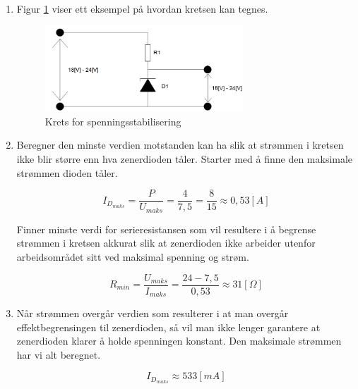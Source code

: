 \begin{solution}[name=Løsningsforslag oppgave]
\begin{enumerate}[label=\roman*)]
	\item Figur \ref{fig:zenKrets1} viser ett eksempel på hvordan kretsen kan tegnes.
		\begin{figure}[H]
			\centering
			\includegraphics[width=0.7\textwidth]{diode/figurer/zenKrets1.png}
			\caption{Krets for spenningsstabilisering}
			\label{fig:zenKrets1}
		\end{figure}
	\item Beregner den minste verdien motstanden kan ha slik at strømmen i kretsen ikke blir større enn hva zenerdioden tåler. Starter med å finne den maksimale strømmen dioden tåler.

	\[I_{D_{maks}}=\frac{P}{U_{maks}}=\frac{4}{7,5}=\frac{8}{15}\approx 0,53 [A]\]

	Finner minste verdi for serieresistansen som vil resultere i å begrense strømmen i kretsen akkurat slik at zenerdioden ikke arbeider utenfor arbeidsområdet sitt ved maksimal spenning og strøm.

	\[R_{min}= \frac{U_{maks}}{I_{maks}}= \frac{24-7,5}{0,53} \approx 31 [\Omega]\]

	\item Når strømmen overgår verdien som resulterer i at man overgår effektbegrensingen til zenerdioden, så vil man ikke lenger garantere at zenerdioden klarer å holde spenningen konstant. Den maksimale strømmen har vi alt beregnet.

	\[I_{D_{maks}} \approx 533 [mA]\]
\end{enumerate}
\end{solution}


